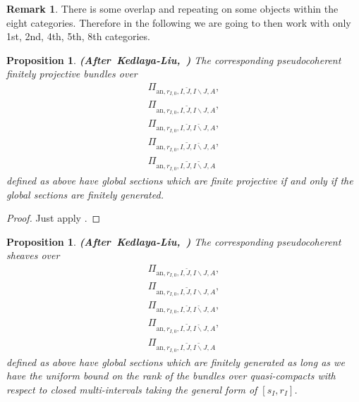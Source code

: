 \documentclass[12pt]{amsart}
\newtheorem{proposition}[theorem]{Proposition}
\theoremstyle{definition}
\newtheorem{remark}[theorem]{Remark}
\numberwithin{equation}{section}
\begin{document}
\begin{remark}
There is some overlap and repeating on some objects within the eight categories. Therefore in the following we are going to then work with only 1st, 2nd, 4th, 5th, 8th categories. 	
\end{remark}
	





\begin{proposition} \mbox{\bf{(After Kedlaya-Liu, \cite[Corollary 2.6.8]{KL2})}}
The corresponding pseudocoherent finitely projective bundles over
\begin{align}
\Pi_{\mathrm{an},r_{I,0},I,\breve{J},I\backslash J,A},\\
\Pi_{\mathrm{an},r_{I,0},I,\widetilde{J},I\backslash J,A},\\
\Pi_{\mathrm{an},r_{I,0},I,\breve{J},\breve{I\backslash J},A},\\
\Pi_{\mathrm{an},r_{I,0},I,\widetilde{J},\breve{I\backslash J},A},\\
\Pi_{\mathrm{an},r_{I,0},I,\widetilde{J},\widetilde{I\backslash J},A}
\end{align}
defined as above have global sections which are finite projective if and only if the global sections are finitely generated. 	
\end{proposition}

\begin{proof}
Just apply \cite[Corollary 2.6.8]{KL2}.	
\end{proof}




\begin{proposition} \mbox{\bf{(After Kedlaya-Liu, \cite[Proposition 2.6.17]{KL2})}}
The corresponding pseudocoherent sheaves over
\begin{align}
\Pi_{\mathrm{an},r_{I,0},I,\breve{J},I\backslash J,A},\\
\Pi_{\mathrm{an},r_{I,0},I,\widetilde{J},I\backslash J,A},\\
\Pi_{\mathrm{an},r_{I,0},I,\breve{J},\breve{I\backslash J},A},\\
\Pi_{\mathrm{an},r_{I,0},I,\widetilde{J},\breve{I\backslash J},A},\\
\Pi_{\mathrm{an},r_{I,0},I,\widetilde{J},\widetilde{I\backslash J},A}
\end{align}
defined as above have global sections which are finitely generated as long as we have the uniform bound on the rank of the bundles over quasi-compacts with respect to closed multi-intervals taking the general form of $[s_I,r_I]$. 	
\end{proposition}
\end{document}
